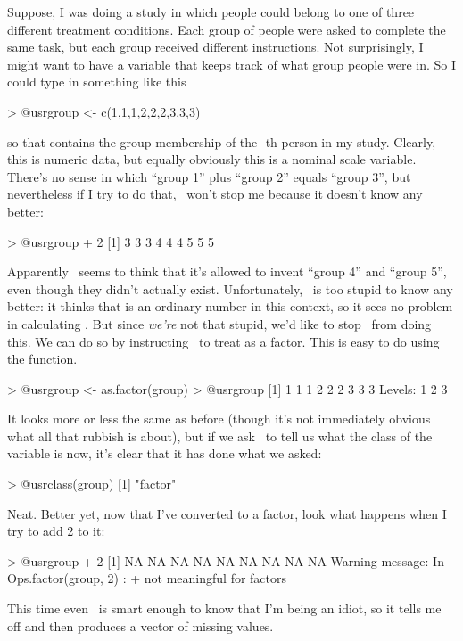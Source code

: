 Suppose, I was doing a study in which people could belong to one of three different treatment conditions. Each group of people were asked to complete the same task, but each group received different instructions. Not surprisingly, I might want to have a variable that keeps track of what group people were in. So I could type in something like this
\begin{rblock1}
> @usr{group <- c(1,1,1,2,2,2,3,3,3)}
\end{rblock1}
so that  contains the group membership of the -th person in my study. Clearly, this is numeric data, but equally obviously this is a nominal scale variable. There's no sense in which ``group 1'' plus ``group 2'' equals ``group 3'', but nevertheless if I try to do that, \R\ won't stop me because it doesn't know any better:
\begin{rblock1}
> @usr{group + 2}
 [1] 3 3 3 4 4 4 5 5 5 
\end{rblock1}
Apparently \R\ seems to think that it's allowed to invent ``group 4'' and ``group 5'', even though they didn't actually exist. Unfortunately, \R\ is too stupid to know any better: it thinks that  is an ordinary number in this context, so it sees no problem in calculating . But since {\it we're} not that stupid, we'd like to stop \R\ from doing this. We can do so by instructing \R\ to treat  as a factor.  This is easy to do using the  function. 
\begin{rblock1}
> @usr{group <- as.factor(group)}
> @usr{group}
 [1] 1 1 1 2 2 2 3 3 3 
 Levels: 1 2 3
\end{rblock1}
It looks more or less the same as before (though it's not immediately obvious what all that  rubbish is about), but if we ask \R\ to tell us what the class of the  variable is now, it's clear that it has done what we asked:
\begin{rblock1}
> @usr{class(group)}
[1] "factor"
\end{rblock1}
Neat. Better yet, now that I've converted  to a factor, look what happens when I try to add 2 to it:
\begin{rblock1}
> @usr{group + 2}
[1] NA NA NA NA NA NA NA NA NA
Warning message:
In Ops.factor(group, 2) : + not meaningful for factors
\end{rblock1}
This time even \R\ is smart enough to know that I'm being an idiot, so it tells me off and then produces a vector of missing values. %


